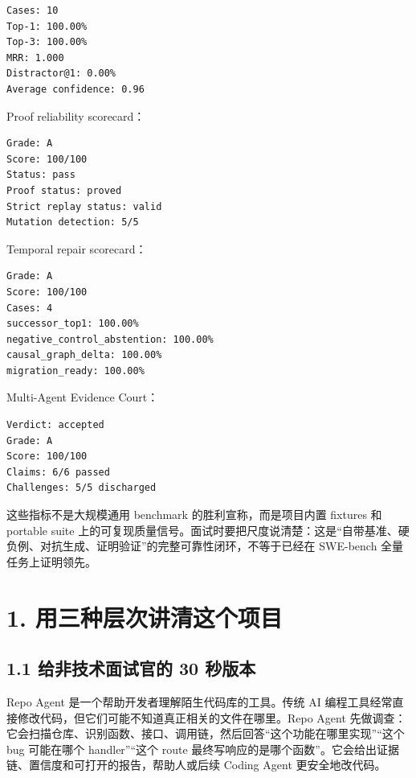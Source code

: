 \documentclass[UTF8,12pt,openany]{ctexbook}
\begin{document}
\begin{lstlisting}
Cases: 10
Top-1: 100.00%
Top-3: 100.00%
MRR: 1.000
Distractor@1: 0.00%
Average confidence: 0.96
\end{lstlisting}

Proof reliability scorecard：\par

\begin{lstlisting}
Grade: A
Score: 100/100
Status: pass
Proof status: proved
Strict replay status: valid
Mutation detection: 5/5
\end{lstlisting}

Temporal repair scorecard：\par

\begin{lstlisting}
Grade: A
Score: 100/100
Cases: 4
successor_top1: 100.00%
negative_control_abstention: 100.00%
causal_graph_delta: 100.00%
migration_ready: 100.00%
\end{lstlisting}

Multi-Agent Evidence Court：\par

\begin{lstlisting}
Verdict: accepted
Grade: A
Score: 100/100
Claims: 6/6 passed
Challenges: 5/5 discharged
\end{lstlisting}

这些指标不是大规模通用 benchmark 的胜利宣称，而是项目内置 fixtures 和 portable suite 上的可复现质量信号。面试时要把尺度说清楚：这是“自带基准、硬负例、对抗生成、证明验证”的完整可靠性闭环，不等于已经在 SWE-bench 全量任务上证明领先。\par

\section{1. 用三种层次讲清这个项目}

\subsection{1.1 给非技术面试官的 30 秒版本}

Repo Agent 是一个帮助开发者理解陌生代码库的工具。传统 AI 编程工具经常直接修改代码，但它们可能不知道真正相关的文件在哪里。Repo Agent 先做调查：它会扫描仓库、识别函数、接口、调用链，然后回答“这个功能在哪里实现”“这个 bug 可能在哪个 handler”“这个 route 最终写响应的是哪个函数”。它会给出证据链、置信度和可打开的报告，帮助人或后续 Coding Agent 更安全地改代码。\par
\end{document}
